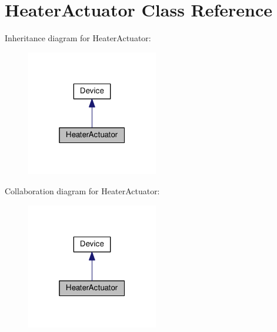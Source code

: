 \hypertarget{class_heater_actuator}{}\section{Heater\+Actuator Class Reference}
\label{class_heater_actuator}


Inheritance diagram for Heater\+Actuator\+:
\nopagebreak
\begin{figure}[H]
\begin{center}
\leavevmode
\includegraphics[width=163pt]{class_heater_actuator__inherit__graph}
\end{center}
\end{figure}


Collaboration diagram for Heater\+Actuator\+:
\nopagebreak
\begin{figure}[H]
\begin{center}
\leavevmode
\includegraphics[width=163pt]{class_heater_actuator__coll__graph}
\end{center}
\end{figure}

